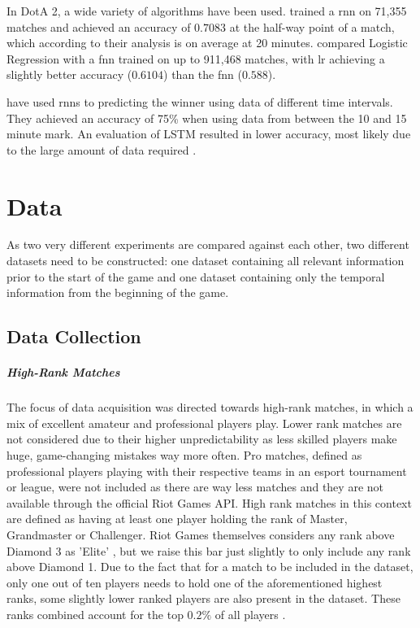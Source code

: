 \documentclass[12pt, a4paper, headinclude, twoside, plainheadsepline, open=right, numbers=noenddot, hidelinks, toc=listof, toc=bibliography]{scrreprt}
\begin{document}
In DotA 2, a wide variety of algorithms have been used.  
 \cite{yuMOBASliceTimeSlice2018} trained a \ac{rnn} on 71,355 matches and achieved an accuracy of $0.7083$ at the half-way point of a match, which according to their analysis is on average at 20 minutes.
 \cite{wangPredictingMultiplayerOnline2016} compared Logistic Regression with a \ac{fnn} trained on up to 911,468 matches, with \ac{lr} achieving a slightly better accuracy ($0.6104$) than the \ac{fnn} ($0.588$).


 have used \acp{rnn} to predicting the winner using data of different time intervals. They achieved an accuracy of 75\% when using data from between the 10 and 15 minute mark.
An evaluation of LSTM resulted in lower accuracy, most likely due to the large amount of data required \cite{silvaContinuousOutcomePrediction2018}.



\chapter{Data}
\label{chap:data}

As two very different experiments are compared against each other, two different datasets need to be constructed: one dataset containing all relevant information prior to the start of the game and one dataset containing only the temporal information from the beginning of the game.


\section{Data Collection}
\label{sec:datacoll}

\paragraph{High-Rank Matches}
The focus of data acquisition was directed towards high-rank matches, in which a mix of excellent amateur and professional players play.
Lower rank matches are not considered due to their higher unpredictability as less skilled players make huge, game-changing mistakes way more often.
Pro matches, defined as professional players playing with their respective teams in an esport tournament or league, were not included as there are way less matches and they are not available through the official Riot Games API.
High rank matches in this context are defined as having at least one player holding the rank of Master, Grandmaster or Challenger.
Riot Games themselves considers any rank above Diamond 3 as 'Elite' \cite{riotgamesDevBalanceFramework2020}, but we raise this bar just slightly to only include any rank above Diamond 1.
Due to the fact that for a match to be included in the dataset, only one out of ten players needs to hold one of the aforementioned highest ranks, some slightly lower ranked players are also present in the dataset.
These ranks combined account for the top $0.2\%$ of all players \cite{riotgamesRankedTiersDivisions2023}.
\end{document}
